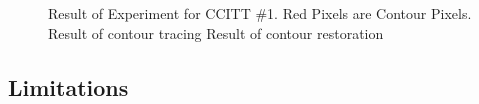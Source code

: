 \begin{figure}[htbp]
	\centering
	 
	\caption{Result of Experiment for CCITT \#1. Red Pixels are Contour Pixels. \protect{} Result of contour tracing \protect{} Result of contour restoration}
	\label{fig:image20}
\end{figure}



\subsection{Limitations}

